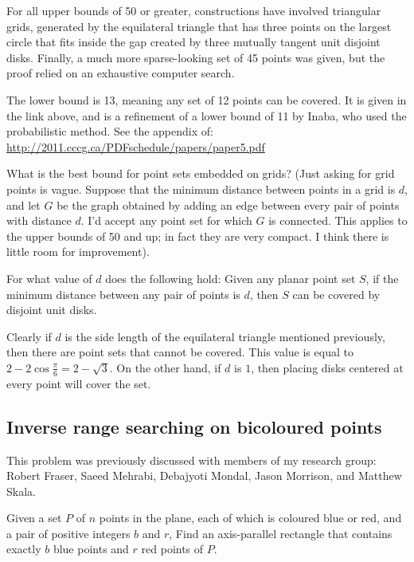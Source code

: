 \documentclass{patmorin}
\newcommand{\poser}[1]{\noindent{\textit{#1}}}
\begin{document}
For all upper bounds of 50 or greater,  constructions have  involved
triangular grids, generated by the equilateral triangle that has
three points on the largest  circle that fits inside the gap created
by three mutually tangent unit disjoint disks.  Finally, a much more
sparse-looking set of 45 points was given, but the proof relied on an
exhaustive computer search.

The lower bound is 13, meaning any set of 12 points can be covered.
It is given in the link above, and is a refinement of a lower bound of
11 by  Inaba, who used the probabilistic method. See the appendix of:
\url{http://2011.cccg.ca/PDFschedule/papers/paper5.pdf}

\begin{op}
  What is the best bound for point sets embedded on grids?
  (Just asking for grid points is vague.  Suppose that the minimum distance
  between points in a grid is $d$, and let $G$ be the graph obtained
  by adding an edge between every pair of points with distance $d$.
  I'd accept any point set for which $G$ is connected.  This applies to
  the upper bounds of 50 and up; in fact they are very compact.  I  think
  there is little room for improvement).
\end{op}

\begin{op}
  For what value of $d$ does the following hold: Given any planar point
  set $S$, if the minimum distance between any pair of points is $d$,
  then $S$ can be covered by disjoint unit disks.
\end{op}

Clearly if $d$ is  the side length of the equilateral triangle mentioned
previously, then there are point sets that cannot be covered.   This value
is equal to $2-2\cos\frac{\pi}{6} = 2{-}\sqrt{3}$.  On the other hand, if
$d$ is $1$, then placing disks centered at every point will cover the set.

\subsection{Inverse range searching on bicoloured points}

\poser{Stephane Durocher}

This problem was previously discussed with members of my research group:
Robert Fraser, Saeed Mehrabi, Debajyoti Mondal, Jason Morrison, 
and Matthew Skala.

\begin{op}
  Given a set $P$ of $n$ points in the plane, each of which is coloured
  blue or red, and a pair of positive integers $b$ and $r$, Find an
  axis-parallel rectangle that contains exactly $b$ blue points and $r$
  red points of $P$.
\end{op}
\end{document}
